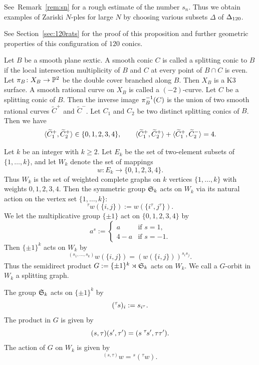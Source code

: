 \documentclass{amsart} %
\newcommand{\ps}{B}
\newcommand{\con}{C}
\newcommand{\wtcon}{\widetilde{\con}}
\newcommand{\pips}{\pi_{\ps}}
\newcommand{\Xps}{X_{\ps}}
\begin{document}
%
See~Remark~\ref{rem:sn} 
for a rough estimate of the number $s_n$.
Thus we obtain examples of Zariski $N$-ples 
for large $N$ by choosing various subsets $\Delta$
of $\Delta_{120}$.
\par
%
See Section~\ref{sec:120rats} for the proof of this proposition and 
further geometric properties of this configuration of $120$ conics.
%
\par
%
Let $\ps$ be a smooth plane sextic.
A smooth conic $\con$ is called a splitting  conic to $\ps$
if the local intersection multiplicity of $\ps$ and $\con$ at every point of
$\ps\cap\con$ is even.
%
%
Let $\pips\colon\Xps\to\PP^2$ be the double cover branched along $\ps$.
Then $\Xps$ is a K3 surface.
A smooth rational curve on $\Xps$ is called a $(-2)$-curve.
Let $\con$ be a splitting conic of $\ps$.
Then 
the inverse image 
$\pips\inv (\con)$
 is the union of two smooth rational curves 
$\wtcon^+$ and $\wtcon^-$.
Let $\con_1$ and $\con_2$ be two distinct splitting conics of  $\ps$.
Then we have
\[
\intf{\wtcon_1^+, \wtcon_2^+}\in \{0,1,2,3,4\},
\qquad 
\intf{\wtcon_1^+, \wtcon_2^+}+\intf{\wtcon_1^+, \wtcon_2^-}=4.
\]
\par
Let $k$ be an integer with $k\ge 2$.
Let $E_k$ be the set of two-element subsets of $\{1,…,k\}$,
and  let
$W_k$ denote the set of mappings 
\[
w\colon E_k\to \{0,1,2,3,4\}.
\]
Thus $W_k$ is the set of weighted complete graphs on $k$ vertices $\{1, \dots, k\}$  with weights $0,1,2,3,4$.
Then the symmetric group $\mathord{\mathfrak{S}}_k$ acts on $W_k$  via its natural action on the vertex set
$\{1, \dots, k\}$:
\[
{}^\tau w (\{i, j\}):=w(\{i^\tau, j^\tau\}).
\]
We let the multiplicative group $\{\pm 1\}$ act on $ \{0,1,2,3,4\}$ by 
\[
a^s :=
\begin{cases}
a     & \text{if } s=1,\\
4-a   & \text{if } s=-1.
\end{cases}
\]
Then $\{\pm 1\}^k$ acts on $W_k$ by 
\[
{}^{(s_1, \dots, s_k)} w(\{i, j\})=(w(\{i, j\}))^{s_i s_j}.
\]
Thus the semidirect product  $G:=\{\pm 1\}^k\rtimes \mathord{\mathfrak{S}}_k$ acts on $W_k$.
We call a $G$-orbit in $W_k$ a splitting graph.
%
\begin{remark}
The group $\mathord{\mathfrak{S}}_k$ acts on $\{\pm 1\}^k$ by 
 \[
 ({}^\tau\hskip -1pt s)_i:=s_{i^\tau}.
\]
The product in  $G$ is given by
\[
(s, \tau)(s^{\prime}, \tau^{\prime})=(s \;{}^\tau \hskip -1pts^{\prime}, \tau\tau^{\prime}).
\]
The action of $G$ on $W_k$ is given by 
\[
{}^{(s, \tau)} w={}^s ({}^\tau w).
\]
\end{remark}
\end{document}
